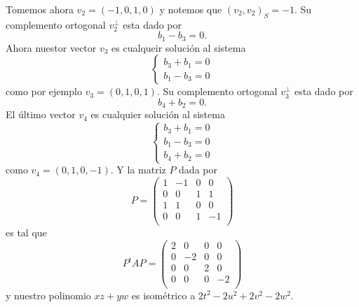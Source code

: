 \documentclass[twocolumn]{notasdeclase}
\newcommand{\bform}[2]{(#1,#2)}
\begin{document}
\begin{sol}
Tomemos ahora $v_2 = (-1,0,1,0)$ y notemos que $\bform{v_2}{v_2}_S = -1$. Su complemento ortogonal $v_2^\perp$ esta dado por
\[ b_1-b_3 = 0. \]
Ahora nuestor vector $v_3$ es cualqueir solución al sistema
\[ \begin{cases}
b_3+b_1 = 0 \\
b_1-b_3 = 0
\end{cases} \]
como por ejemplo $v_3 = (0,1,0,1)$. Su complemento ortogonal $v_3^\perp$ esta dado por
\[ b_4+b_2 = 0. \]
El último vector $v_4$ es cualquier solución al sistema 
\[ \begin{cases}
b_3+b_1 = 0 \\
b_1-b_3 = 0 \\
b_4+b_2 = 0
\end{cases} \]
como $v_4 = (0,1,0,-1)$. Y la matriz $P$ dada por
\[ P = \begin{pmatrix}
1 & -1& 0& 0\\
0 & 0& 1& 1\\
1 & 1& 0& 0\\
0 & 0& 1& -1\\
\end{pmatrix} \]
es tal que 
\[ P^tAP =  \begin{pmatrix}
2 & 0& 0& 0\\
0 & -2& 0& 0\\
0 & 0& 2& 0\\
0 & 0& 0& -2\\
\end{pmatrix} \]
y nuestro polinomio $xz+yw$ es isométrico a $2t^2-2u^2+2v^2-2w^2$.
\end{sol}
\end{document}
